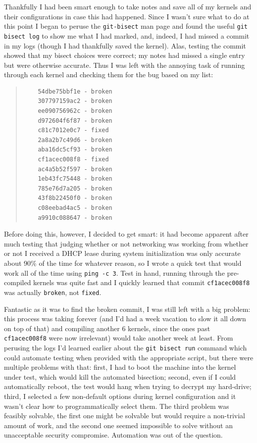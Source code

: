 \documentclass{article}
\begin{document}
Thankfully I had been smart enough to take notes and save all of my kernels and their configurations in case this had happened.  Since I wasn't sure what to do at this point I began to peruse the \texttt{git-bisect} man page and found the useful \texttt{git bisect log} to show me what I had marked, and, indeed, I had missed a commit in my logs (though I had thankfully saved the kernel).  Alas, testing the commit showed that my bisect choices were correct; my notes had missed a single entry but were otherwise accurate.  Thus I was left with the annoying task of running through each kernel and checking them for the bug based on my list:
\begin{quote}
\begin{verbatim}
	54dbe75bbf1e - broken
	307797159ac2 - broken
	ee090756962c - broken
	d972604f6f87 - broken
	c81c7012e0c7 - fixed
	2a8a2b7c49d6 - broken
	aba16dc5cf93 - broken
	cf1acec008f8 - fixed
	ac4a5b52f597 - broken
	1eb43fc75448 - broken
	785e76d7a205 - broken
	43f8b22450f0 - broken
	c08eebad4ac5 - broken
	a9910c088647 - broken
\end{verbatim}
\end{quote}
Before doing this, however, I decided to get smart: it had become apparent after much testing that judging whether or not networking was working from whether or not I received a DHCP lease during system initialization was only accurate about 90\% of the time for whatever reason, so I wrote a quick test that would work all of the time using \texttt{ping -c 3}.  Test in hand, running through the pre-compiled kernels was quite fast and I quickly learned that commit \texttt{cf1acec008f8} was actually \texttt{broken}, not \texttt{fixed}.

Fantastic as it was to find the broken commit, I was still left with a big problem: this process was taking forever (and I'd had a week vacation to slow it all down on top of that) and compiling another 6 kernels, since the ones past \texttt{cf1acec008f8} were now irrelevant) would take another week at least.  From perusing the logs I'd learned earlier about the \texttt{git bisect run} command which could automate testing when provided with the appropriate script, but there were multiple problems with that: first, I had to boot the machine into the kernel under test, which would kill the automated bisection; second, even if I could automatically reboot, the test would hang when trying to decrypt my hard-drive; third, I selected a few non-default options during kernel configuration and it wasn't clear how to programmatically select them.  The third problem was feasibly solvable, the first one might be solvable but would require a non-trivial amount of work, and the second one seemed impossible to solve without an unacceptable security compromise.  Automation was out of the question.
\end{document}

